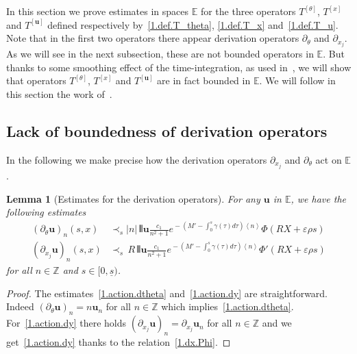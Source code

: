 \documentclass[10pt]{amsart}
\newtheorem{lemm}[cdrthm]{Lemma}
\theoremstyle{definition}
\theoremstyle{plain}
\newcommand*\e{\varepsilon}
\newcommand*\Z{{\mathbb Z}}
\newcommand{\dptl}{\partial}%
\newcommand*\EE{{\mathbb E}}
\newcommand*\g{\gamma}
\newcommand{\ubf}{{\mathbf u}}
\newcommand*\dsp{\displaystyle}
\newcommand*\und{\underline}
\DeclarePairedDelimiter{\VERT}{|\mkern -1.6mu|\mkern -1.6mu|}{|\mkern -1.6mu|\mkern -1.6mu|}
\begin{document}
In this section we prove estimates in spaces $\EE$ for the three operators $T^{[\theta]}$, $T^{[x]}$ and $T^{[\ubf]}$ defined respectively by~\eqref{1.def.T_theta}, \eqref{1.def.T_x} and~\eqref{1.def.T_u}. Note that in the first two operators there appear derivation operators $\dptl_{\theta}$ and $\dptl_{x_j}$. As we will see in the next subsection, these are not bounded operators in $\EE$. But thanks to some smoothing effect of the time-integration, as used in~\cite{metivier2005remarks}, we will show that operators $T^{[\theta]}$, $T^{[x]}$ and $T^{[\ubf]}$ are in fact bounded in $\EE$. We will follow in this section the work of~\cite{ukai2001boltzmann}.



\subsection{Lack of boundedness of derivation operators}


In the following we make precise how the derivation operators $\dptl_{x_j}$ and $\dptl_{\theta}$ act on $\EE$.

\begin{lemm}[Estimates for the derivation operators]\label{1.lemma.derivation}
For any $\ubf$ in $\EE$, we have the following estimates
\begin{align}
(\dptl_{\theta}\ubf)_n(s,x) & \prec_{s} |n| \,\VERT{\ubf} \frac{\dsp c_1}{\dsp n^2+1} e^{{}-(M'- \int_{0}^{s}\g(\tau) d\tau) \left<n\right>} \Phi\left(R X+\e\rho s\right) \label{1.action.dtheta}
\\
(\dptl_{x_j}\ubf)_n(s,x) & \prec_{s} \,R \,\VERT{\ubf} \frac{\dsp c_1}{\dsp n^2+1} e^{{}-(M'- \int_{0}^{s}\g(\tau) d\tau) \left<n\right>} \Phi'\left(R X+\e\rho s\right) \label{1.action.dy}
\end{align}
for all $n\in\Z$ and $s\in[0,\und{s})$.
\end{lemm}

\begin{proof}
The estimates~\eqref{1.action.dtheta} and~\eqref{1.action.dy} are straightforward. Indeed $(\dptl_{\theta}\ubf)_n = n \ubf_n $ for all $n\in\Z $ which implies~\eqref{1.action.dtheta}. For~\eqref{1.action.dy} there holds $(\dptl_{x_j}\ubf)_n = \dptl_{x_j} \ubf_n $ for all $ n\in\Z $ and we get~\eqref{1.action.dy} thanks to the relation~\eqref{1.dx.Phi}.
\end{proof}
\end{document}
